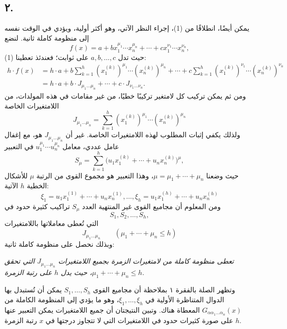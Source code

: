 \documentclass[11pt]{article}
\begin{document}
\subsection*{٢.}
يمكن أيضًا، انطلاقًا من (1)، إجراء النظر الآتي، وهو أكثر أولية، ويؤدي في الوقت نفسه إلى منظومة كاملة ثانية. لنضع
\[
  f(x)=a+b x_1^{\mu_1}\cdots x_n^{\mu_n}
       +\cdots+c x_1^{\nu_1}\cdots x_n^{\nu_n},
\]
حيث تدل $a,b,\ldots,c$ على ثوابت؛ فعندئذ تعطينا (1):
\[
\begin{aligned}
 h\cdot f(x)
 &=h\cdot a+b\sum_{k=1}^{h}(x_1^{(k)})^{\mu_1}\cdots(x_n^{(k)})^{\mu_n}
     +\cdots
     +c\sum_{k=1}^{h}(x_1^{(k)})^{\nu_1}\cdots(x_n^{(k)})^{\nu_n} \\
 &=h\cdot a+b\cdot J_{\mu_1\ldots\mu_n}+\cdots+c\cdot J_{\nu_1\ldots\nu_n}.
\end{aligned}
\]
ومن ثم يمكن تركيب كل لامتغير تركيبًا خطيًا، من غير مقامات في هذه المولدات، من اللامتغيرات الخاصة
\[
  J_{\mu_1\ldots\mu_n}
  =\sum_{k=1}^{h}(x_1^{(k)})^{\mu_1}\cdots(x_n^{(k)})^{\mu_n}
\]
ولذلك يكفي إثبات المطلوب لهذه اللامتغيرات الخاصة. غير أن $J_{\mu_1\ldots\mu_n}$ هو، مع إغفال عامل عددي، معامل $u_1^{\mu_1}\cdots u_n^{\mu_n}$ في التعبير
\[
  S_\mu=\sum_{k=1}^{h}
  \bigl(u_1x_1^{(k)}+\cdots+u_nx_n^{(k)}\bigr)^{\mu},
\]
حيث وضعنا $\mu=\mu_1+\cdots+\mu_n$، وهذا التعبير هو مجموع القوى من الرتبة $\mu$ للأشكال الخطية $h$ الآتية:
\[
  \xi_1=u_1x_1^{(1)}+\cdots+u_nx_n^{(1)},\ldots,
  \xi_h=u_1x_1^{(h)}+\cdots+u_nx_n^{(h)}
\]
ومن المعلوم أن مجاميع القوى غير المنتهية العدد $S_\mu$ تراكيب كثيرة حدود في
\[
  S_1,S_2,\ldots,S_h,
\]
التي تُعطى معاملاتها باللامتغيرات
\[
  J_{\mu_1\ldots\mu_n}\qquad(\mu_1+\cdots+\mu_n\le h)
\]
وبذلك نحصل على منظومة كاملة ثانية:

\emph{تعطى منظومة كاملة من لامتغيرات الزمرة بجميع اللامتغيرات $J_{\mu_1\ldots\mu_n}$ التي تحقق $\mu_1+\cdots+\mu_n\le h$، حيث يدل $h$ على رتبة الزمرة.}

وتظهر الصلة بالفقرة ١ بملاحظة أن مجاميع القوى $S_1,\ldots,S_h$ يمكن أن تُستبدل بها الدوال المتناظرة الأولية في $\xi_1,\ldots,\xi_h$، وهو ما يؤدي إلى المنظومة الكاملة من $G_{\alpha\alpha_1\ldots\alpha_n}(x)$ المعطاة هناك. وتبين النتيجتان أن جميع اللامتغيرات يمكن التعبير عنها على صورة كثيرات حدود في اللامتغيرات التي لا تتجاوز درجتها في $x$ رتبة الزمرة $h$.
\end{document}
